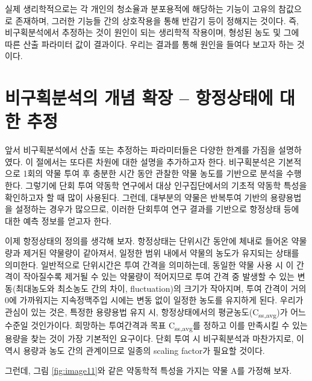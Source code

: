 \documentclass[
  11pt,
  krantz2, a4paper, twoside]{krantz}
\theoremstyle{definition}
\theoremstyle{definition}
\theoremstyle{definition}
\theoremstyle{definition}
\theoremstyle{remark}
\begin{document}
실제 생리학적으로는 각 개인의 청소율과 분포용적에 해당하는 기능이 고유의 참값으로 존재하며, 그러한 기능들 간의 상호작용을 통해 반감기 등이 정해지는 것이다.
즉, 비구획분석에서 추정하는 것이 원인이 되는 생리학적 작용이며, 형성된 농도 및 그에 따른 산출 파라미터 값이 결과이다.
우리는 결과를 통해 원인을 들여다 보고자 하는 것이다.

\section{비구획분석의 개념 확장 -- 항정상태에 대한 추정}\label{uxbe44uxad6cuxd68duxbd84uxc11duxc758-uxac1cuxb150-uxd655uxc7a5-uxd56duxc815uxc0c1uxd0dcuxc5d0-uxb300uxd55c-uxcd94uxc815}

 

앞서 비구획분석에서 산출 또는 추정하는 파라미터들은 다양한 한계를 가짐을 설명하였다.
이 절에서는 또다른 차원에 대한 설명을 추가하고자 한다.
비구획분석은 기본적으로 1회의 약물 투여 후 충분한 시간 동안 관찰한 약물 농도를 기반으로 분석을 수행한다.
그렇기에 단회 투여 약동학 연구에서 대상 인구집단에서의 기초적 약동학 특성을 확인하고자 할 때 많이 사용된다.
그런데, 대부분의 약물은 반복투여 기반의 용량용법을 설정하는 경우가 많으므로, 이러한 단회투여 연구 결과를 기반으로 항정상태 등에 대한 예측 정보를 얻고자 한다.

이제 항정상태의 정의를 생각해 보자.
항정상태는 단위시간 동안에 체내로 들어온 약물량과 제거된 약물량이 같아져서, 일정한 범위 내에서 약물의 농도가 유지되는 상태를 의미한다.
일반적으로 단위시간은 투여 간격을 의미하는데, 동일한 약물 사용 시 이 간격이 작아질수록 제거될 수 있는 약물량이 적어지므로 투여 간격 중 발생할 수 있는 변동(최대농도와 최소농도 간의 차이, fluctuation)의 크기가 작아지며, 투여 간격이 거의 0에 가까워지는 지속정맥주입 시에는 변동 없이 일정한 농도를 유지하게 된다. 우리가 관심이 있는 것은, 특정한 용량용법 유지 시, 항정상태에서의 평균농도(C\textsubscript{ss,avg})가 어느 수준일 것인가이다. 
희망하는 투여간격과 목표 C\textsubscript{ss,avg}를 정하고 이를 만족시킬 수 있는 용량을 찾는 것이 가장 기본적인 요구이다.
단회 투여 시 비구획분석과 마찬가지로, 이 역시 용량과 농도 간의 관계이므로 일종의 scaling factor가 필요할 것이다.

그런데, 그림 \ref{fig:image11}와 같은 약동학적 특성을 가지는 약물 A를 가정해 보자.
\end{document}
